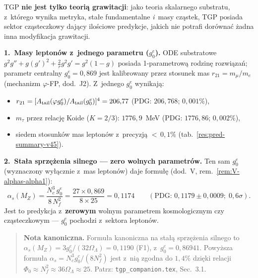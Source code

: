 \begin{remark}%
\label{rem:particle-sector-highlight}
TGP \textbf{nie jest tylko teori\k{a} grawitacji}: jako teoria skalarnego
substratu, z~kt\'orego wynika metryka, sta\l{}e fundamentalne
\emph{i}~masy cz\k{a}stek, TGP posiada sektor cz\k{a}steczkowy
daj\k{a}cy ilo\'sciowe predykcje, jakich nie potrafi dor\'owna\'c
\.zadna inna modyfikacja grawitacji.

\medskip\noindent
\textbf{1.\ Masy lepton\'ow z~jednego parametru ($g_0^e$).}
ODE substratowe $g^2g'' + g(g')^2 + \frac{2}{r}g^2g' = g^2(1-g)$
posiada 1-parametrow\k{a} rodzin\k{e} rozwi\k{a}za\'n;
parametr centralny $g_0^e = 0{,}869$ jest kalibrowany
przez stosunek mas $r_{21} = m_\mu/m_e$
(mechanizm $\varphi$-FP, dod.~J2).
Z~jednego $g_0^e$ wynikaj\k{a}:
\begin{itemize}[nosep]
  \item $r_{21} = [A_{\rm tail}(\varphi g_0^e)/A_{\rm tail}(g_0^e)]^4
        = 206{,}77$ \quad(PDG: $206{,}768$; $0{,}001\%$),
  \item $m_\tau$ przez relacj\k{e} Koide ($K = 2/3$): $1776{,}9$~MeV
        \quad(PDG: $1776{,}86$; $0{,}002\%$),
  \item siedem stosunk\'ow mas lepton\'ow z~precyzj\k{a} ${<}\,0{,}1\%$
        (tab.~\ref{res:pred-summary-v45}).
\end{itemize}

\medskip\noindent
\textbf{2.\ Sta\l{}a sprz\k{e}\.zenia silnego --- zero wolnych parametr\'ow.}
Ten sam $g_0^e$ (wyznaczony wy\l{}\k{a}cznie z~mas lepton\'ow)
daje formu\l{}\k{e} (dod.~V, rem.~\ref{rem:V-alphas-alpha1}):
\begin{equation}\label{eq:alphas-highlight}
  \alpha_s(M_Z) = \frac{N_c^3\,g_0^e}{8\,N_f^2}
  = \frac{27 \times 0{,}869}{8 \times 25} = 0{,}1174
  \qquad (\text{PDG: } 0{,}1179 \pm 0{,}0009;\; 0{,}6\sigma).
\end{equation}
Jest to predykcja z~\textbf{zerowym} wolnym parametrem kosmologicznym
czy cz\k{a}steczkowym --- $g_0^e$ pochodzi z~sektora lepton\'ow.

\begin{quote}
\textbf{Nota kanoniczna.} Formu\l{}a kanoniczna na sta\l{}\k{a} sprz\k{e}\.zenia silnego to
$\alpha_s(M_Z) = 3g_0^e/(32\Omega_\Lambda) = 0{,}1190$ (F1),
z~$g_0^e = 0{,}86941$.
Powy\.zsza formu\l{}a $\alpha_s = N_c^3 g_0^e/(8N_f^2)$ jest z~ni\k{a} zgodna
do $1{,}4\%$ dzi\k{e}ki relacji
$\Phi_0 \approx N_f^2 \approx 36\Omega_\Lambda \approx 25$.
Patrz: \texttt{tgp\_companion.tex}, Sec.~3.1.
\end{quote}


\end{remark}
